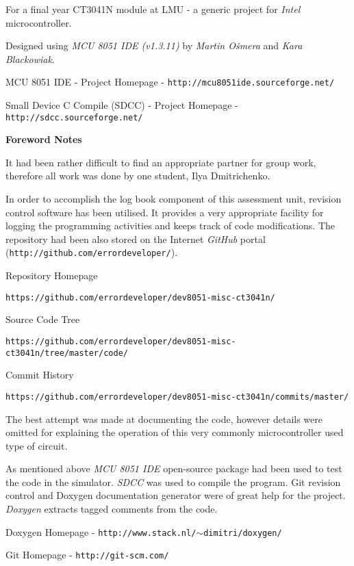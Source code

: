 For a final year CT3041N module at LMU -\/ a generic project for {\itshape Intel\/} {} microcontroller.

Designed using {\itshape MCU 8051 IDE (v1.3.11)\/} by {\itshape Martin Ošmera\/} and {\itshape Kara Blackowiak\/}. {\itshape 
\begin{DoxyItemize}
\item MCU 8051 IDE -\/ Project Homepage -\/ {\tt http://mcu8051ide.sourceforge.net/}
\item Small Device C Compile (SDCC) -\/ Project Homepage -\/ {\tt http://sdcc.sourceforge.net/}
\end{DoxyItemize}\/}

{\bfseries Foreword Notes}

It had been rather difficult to find an appropriate partner for group work, therefore all work was done by one student, Ilya Dmitrichenko.

In order to accomplish the log book component of this assessment unit, revision control software has been utilised. It provides a very appropriate facility for logging the programming activities and keeps track of code modifications. The repository had been also stored on the Internet {\itshape GitHub\/} portal ({\tt http://github.com/errordeveloper/}).


\begin{DoxyItemize}
\item Repository Homepage
\begin{DoxyItemize}
\item {\tt https://github.com/errordeveloper/dev8051-\/misc-\/ct3041n/}
\end{DoxyItemize}
\item Source Code Tree
\begin{DoxyItemize}
\item {\tt https://github.com/errordeveloper/dev8051-\/misc-\/ct3041n/tree/master/code/}
\end{DoxyItemize}
\item Commit History
\begin{DoxyItemize}
\item {\tt https://github.com/errordeveloper/dev8051-\/misc-\/ct3041n/commits/master/}
\end{DoxyItemize}
\end{DoxyItemize}The best attempt was made at documenting the code, however details were omitted for explaining the operation of this very commonly microcontroller used type of circuit.

As mentioned above {\itshape MCU 8051 IDE\/} open-\/source package had been used to test the code in the simulator. {\itshape SDCC\/} was used to compile the program. Git revision control and Doxygen documentation generator were of great help for the project. {\itshape Doxygen\/} extracts tagged comments from the code. {\itshape 
\begin{DoxyItemize}
\item Doxygen Homepage -\/ {\tt http://www.stack.nl/$\sim$dimitri/doxygen/}
\item Git Homepage -\/ {\tt http://git-\/scm.com/}
\end{DoxyItemize}\/}

